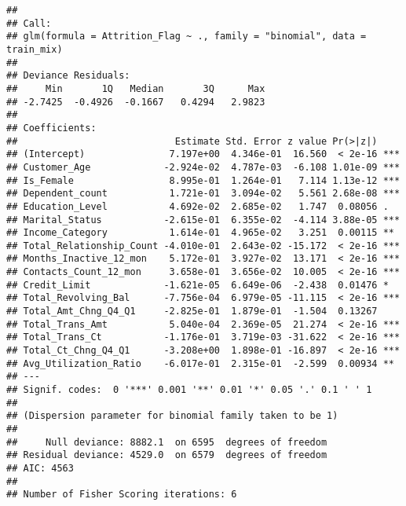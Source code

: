 \documentclass[
]{article}
\newenvironment{Shaded}{\begin{snugshade}}{\end{snugshade}}
\newcommand{\DecValTok}[1]{\textcolor[rgb]{0.00,0.00,0.81}{#1}}
\newcommand{\FloatTok}[1]{\textcolor[rgb]{0.00,0.00,0.81}{#1}}
\newcommand{\FunctionTok}[1]{\textcolor[rgb]{0.00,0.00,0.00}{#1}}
\newcommand{\NormalTok}[1]{#1}
\newcommand{\OtherTok}[1]{\textcolor[rgb]{0.56,0.35,0.01}{#1}}
\newcommand{\SpecialCharTok}[1]{\textcolor[rgb]{0.00,0.00,0.00}{#1}}
\begin{document}
\begin{verbatim}
## 
## Call:
## glm(formula = Attrition_Flag ~ ., family = "binomial", data = train_mix)
## 
## Deviance Residuals: 
##     Min       1Q   Median       3Q      Max  
## -2.7425  -0.4926  -0.1667   0.4294   2.9823  
## 
## Coefficients:
##                            Estimate Std. Error z value Pr(>|z|)    
## (Intercept)               7.197e+00  4.346e-01  16.560  < 2e-16 ***
## Customer_Age             -2.924e-02  4.787e-03  -6.108 1.01e-09 ***
## Is_Female                 8.995e-01  1.264e-01   7.114 1.13e-12 ***
## Dependent_count           1.721e-01  3.094e-02   5.561 2.68e-08 ***
## Education_Level           4.692e-02  2.685e-02   1.747  0.08056 .  
## Marital_Status           -2.615e-01  6.355e-02  -4.114 3.88e-05 ***
## Income_Category           1.614e-01  4.965e-02   3.251  0.00115 ** 
## Total_Relationship_Count -4.010e-01  2.643e-02 -15.172  < 2e-16 ***
## Months_Inactive_12_mon    5.172e-01  3.927e-02  13.171  < 2e-16 ***
## Contacts_Count_12_mon     3.658e-01  3.656e-02  10.005  < 2e-16 ***
## Credit_Limit             -1.621e-05  6.649e-06  -2.438  0.01476 *  
## Total_Revolving_Bal      -7.756e-04  6.979e-05 -11.115  < 2e-16 ***
## Total_Amt_Chng_Q4_Q1     -2.825e-01  1.879e-01  -1.504  0.13267    
## Total_Trans_Amt           5.040e-04  2.369e-05  21.274  < 2e-16 ***
## Total_Trans_Ct           -1.176e-01  3.719e-03 -31.622  < 2e-16 ***
## Total_Ct_Chng_Q4_Q1      -3.208e+00  1.898e-01 -16.897  < 2e-16 ***
## Avg_Utilization_Ratio    -6.017e-01  2.315e-01  -2.599  0.00934 ** 
## ---
## Signif. codes:  0 '***' 0.001 '**' 0.01 '*' 0.05 '.' 0.1 ' ' 1
## 
## (Dispersion parameter for binomial family taken to be 1)
## 
##     Null deviance: 8882.1  on 6595  degrees of freedom
## Residual deviance: 4529.0  on 6579  degrees of freedom
## AIC: 4563
## 
## Number of Fisher Scoring iterations: 6
\end{verbatim}

\begin{Shaded}
\end{Shaded}
\end{document}
